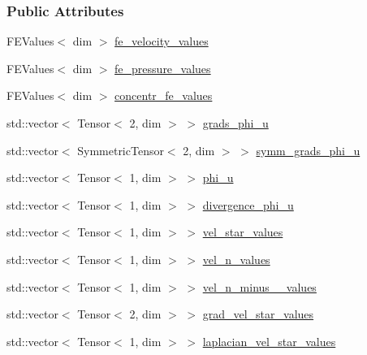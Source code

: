 \subsubsection*{Public Attributes}
\begin{DoxyCompactItemize}
\item 
F\+E\+Values$<$ dim $>$ \hyperlink{struct_assembly_1_1_scratch_1_1diffusion__step_abc801170e70dc1174e7570a16a9c9cef}{fe\+\_\+velocity\+\_\+values}
\item 
F\+E\+Values$<$ dim $>$ \hyperlink{struct_assembly_1_1_scratch_1_1diffusion__step_a8ae6347dd8bec8156be7f56235d7a10f}{fe\+\_\+pressure\+\_\+values}
\item 
F\+E\+Values$<$ dim $>$ \hyperlink{struct_assembly_1_1_scratch_1_1diffusion__step_a419a532515fcf72c1eaad266fb6fe9c8}{concentr\+\_\+fe\+\_\+values}
\item 
std\+::vector$<$ Tensor$<$ 2, dim $>$ $>$ \hyperlink{struct_assembly_1_1_scratch_1_1diffusion__step_a8d840d813840efeef8363b9630714e6d}{grads\+\_\+phi\+\_\+u}
\item 
std\+::vector$<$ Symmetric\+Tensor$<$ 2, dim $>$ $>$ \hyperlink{struct_assembly_1_1_scratch_1_1diffusion__step_a5f7d1700139f21792a1107ede3903cf5}{symm\+\_\+grads\+\_\+phi\+\_\+u}
\item 
std\+::vector$<$ Tensor$<$ 1, dim $>$ $>$ \hyperlink{struct_assembly_1_1_scratch_1_1diffusion__step_a7aeba7bef458d2c451ec2ca3d0ddbd0f}{phi\+\_\+u}
\item 
std\+::vector$<$ Tensor$<$ 1, dim $>$ $>$ \hyperlink{struct_assembly_1_1_scratch_1_1diffusion__step_a78dbb9aa70e10f4e3400a7ea8df0395f}{divergence\+\_\+phi\+\_\+u}
\item 
std\+::vector$<$ Tensor$<$ 1, dim $>$ $>$ \hyperlink{struct_assembly_1_1_scratch_1_1diffusion__step_a94cf958bf7072a08e34291f3b50f2a51}{vel\+\_\+star\+\_\+values}
\item 
std\+::vector$<$ Tensor$<$ 1, dim $>$ $>$ \hyperlink{struct_assembly_1_1_scratch_1_1diffusion__step_a3c69fd1c796447267c5e60b4574b7cd6}{vel\+\_\+n\+\_\+values}
\item 
std\+::vector$<$ Tensor$<$ 1, dim $>$ $>$ \hyperlink{struct_assembly_1_1_scratch_1_1diffusion__step_a9fdda6a8d4c418b53bd1e9c6e03ffc26}{vel\+\_\+n\+\_\+minus\+\_\+\_\+values}
\item 
std\+::vector$<$ Tensor$<$ 2, dim $>$ $>$ \hyperlink{struct_assembly_1_1_scratch_1_1diffusion__step_a63260a19549621cb2c9c737a0a43e3f5}{grad\+\_\+vel\+\_\+star\+\_\+values}
\item 
std\+::vector$<$ Tensor$<$ 1, dim $>$ $>$ \hyperlink{struct_assembly_1_1_scratch_1_1diffusion__step_af7bfee637fae1cadfde75192f16c0684}{laplacian\+\_\+vel\+\_\+star\+\_\+values}

\end{DoxyCompactItemize}
